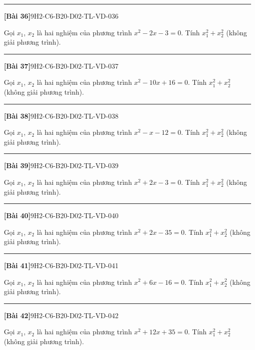 \documentclass[12pt,a4paper]{article}
\newif\ifloigiai
\newenvironment{cauhoi}[2]{%
  \par\medskip\noindent\rule{\textwidth}{0.4pt}\par\nopagebreak
  \noindent\textbf{[#1]}\hfill{\scriptsize\ttfamily #2}\par\nopagebreak\smallskip}{\par}
\newcommand{\loigiai}[1]{\ifloigiai\par\smallskip\noindent\textit{Lời giải.} #1\par\fi}
\begin{document}
\begin{cauhoi}{Bài 36}{9H2-C6-B20-D02-TL-VD-036}
Gọi $x_1$, $x_2$ là hai nghiệm của phương trình $x^{2}-2x-3=0$. Tính $x_1^{2}+x_2^{2}$ (không giải phương trình).
\loigiai{Theo định lí Viète: $x_1+x_2=2$, $x_1x_2=-3$. Suy ra $x_1^{2}+x_2^{2}=(x_1+x_2)^{2}-2x_1x_2=2^{2}-2\cdot(-3)=10$.}
\end{cauhoi}
\begin{cauhoi}{Bài 37}{9H2-C6-B20-D02-TL-VD-037}
Gọi $x_1$, $x_2$ là hai nghiệm của phương trình $x^{2}-10x+16=0$. Tính $x_1^{2}+x_2^{2}$ (không giải phương trình).
\loigiai{Theo định lí Viète: $x_1+x_2=10$, $x_1x_2=16$. Suy ra $x_1^{2}+x_2^{2}=(x_1+x_2)^{2}-2x_1x_2=10^{2}-2\cdot(16)=68$.}
\end{cauhoi}
\begin{cauhoi}{Bài 38}{9H2-C6-B20-D02-TL-VD-038}
Gọi $x_1$, $x_2$ là hai nghiệm của phương trình $x^{2}-x-12=0$. Tính $x_1^{2}+x_2^{2}$ (không giải phương trình).
\loigiai{Theo định lí Viète: $x_1+x_2=1$, $x_1x_2=-12$. Suy ra $x_1^{2}+x_2^{2}=(x_1+x_2)^{2}-2x_1x_2=1^{2}-2\cdot(-12)=25$.}
\end{cauhoi}
\begin{cauhoi}{Bài 39}{9H2-C6-B20-D02-TL-VD-039}
Gọi $x_1$, $x_2$ là hai nghiệm của phương trình $x^{2}+2x-3=0$. Tính $x_1^{2}+x_2^{2}$ (không giải phương trình).
\loigiai{Theo định lí Viète: $x_1+x_2=-2$, $x_1x_2=-3$. Suy ra $x_1^{2}+x_2^{2}=(x_1+x_2)^{2}-2x_1x_2=-2^{2}-2\cdot(-3)=10$.}
\end{cauhoi}
\begin{cauhoi}{Bài 40}{9H2-C6-B20-D02-TL-VD-040}
Gọi $x_1$, $x_2$ là hai nghiệm của phương trình $x^{2}+2x-35=0$. Tính $x_1^{2}+x_2^{2}$ (không giải phương trình).
\loigiai{Theo định lí Viète: $x_1+x_2=-2$, $x_1x_2=-35$. Suy ra $x_1^{2}+x_2^{2}=(x_1+x_2)^{2}-2x_1x_2=-2^{2}-2\cdot(-35)=74$.}
\end{cauhoi}
\begin{cauhoi}{Bài 41}{9H2-C6-B20-D02-TL-VD-041}
Gọi $x_1$, $x_2$ là hai nghiệm của phương trình $x^{2}+6x-16=0$. Tính $x_1^{2}+x_2^{2}$ (không giải phương trình).
\loigiai{Theo định lí Viète: $x_1+x_2=-6$, $x_1x_2=-16$. Suy ra $x_1^{2}+x_2^{2}=(x_1+x_2)^{2}-2x_1x_2=-6^{2}-2\cdot(-16)=68$.}
\end{cauhoi}
\begin{cauhoi}{Bài 42}{9H2-C6-B20-D02-TL-VD-042}
Gọi $x_1$, $x_2$ là hai nghiệm của phương trình $x^{2}+12x+35=0$. Tính $x_1^{2}+x_2^{2}$ (không giải phương trình).
\loigiai{Theo định lí Viète: $x_1+x_2=-12$, $x_1x_2=35$. Suy ra $x_1^{2}+x_2^{2}=(x_1+x_2)^{2}-2x_1x_2=-12^{2}-2\cdot(35)=74$.}
\end{cauhoi}
\end{document}
